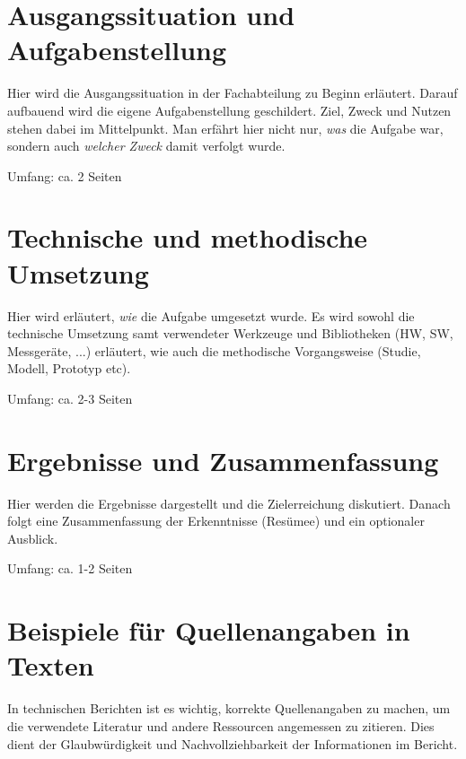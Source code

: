 \documentclass[praktikum,german]{hgbthesis}
\begin{document}
\chapter{Ausgangssituation und Aufgabenstellung}
\color{blue}
Hier wird die Ausgangssituation in der Fachabteilung zu Beginn erläutert. Darauf aufbauend wird die eigene Aufgabenstellung geschildert. Ziel, Zweck und Nutzen stehen dabei im Mittelpunkt. Man erfährt hier nicht nur, \emph{was} die Aufgabe war, sondern auch \emph{welcher Zweck} damit verfolgt wurde.

\vskip 8mm
Umfang: ca. 2 Seiten
\color{black}


\chapter{Technische und methodische Umsetzung}
\color{blue}
Hier wird erläutert, \emph{wie} die Aufgabe umgesetzt wurde. Es wird sowohl die technische Umsetzung samt verwendeter Werkzeuge und Bibliotheken (HW, SW, Messgeräte, ...) erläutert, wie auch die methodische Vorgangsweise (Studie, Modell, Prototyp etc).

\vskip 8mm
Umfang: ca. 2-3 Seiten 
\color{black}

   
\chapter{Ergebnisse und Zusammenfassung}
\color{blue}
Hier werden die Ergebnisse dargestellt und die Zielerreichung diskutiert. Danach folgt eine Zusammenfassung der Erkenntnisse (Resümee) und ein optionaler Ausblick.

\vskip 8mm
Umfang: ca. 1-2 Seiten


\newpage
\appendix                                                             %
\chapter{Beispiele für Quellenangaben in Texten}

In technischen Berichten ist es wichtig, korrekte Quellenangaben zu machen, um die verwendete Literatur und andere Ressourcen angemessen zu zitieren. Dies dient der Glaubwürdigkeit und Nachvollziehbarkeit der Informationen im Bericht.
\end{document}
